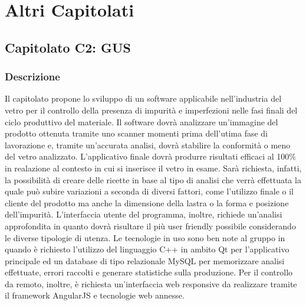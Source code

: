 %

\section{Altri Capitolati}


\subsection{Capitolato C2: GUS}

\subsubsection{Descrizione}
Il capitolato propone lo sviluppo di un software applicabile nell'industria del vetro per il controllo della presenza di impurità e imperfezioni nelle fasi finali del ciclo produttivo del materiale. Il software dovrà analizzare un'immagine del prodotto ottenuta tramite uno scanner momenti prima dell'utima fase di lavorazione e, tramite un'accurata analisi, dovrà stabilire la conformità o meno del vetro analizzato. L'applicativo finale dovrà produrre risultati efficaci al 100\% in realazione al contesto in cui si inserisce il vetro in esame. Sarà richiesta, infatti, la possibilità di creare delle ricette in base al tipo di analisi che verrà effettuata la quale può subire variazioni a seconda di diversi fattori, come l'utilizzo finale o il cliente del prodotto ma anche la dimensione della lastra o la forma e posizione dell'impurità.
L'interfaccia utente del programma, inoltre, richiede un'analisi approfondita in quanto dovrà risultare il più user friendly possibile considerando le diverse tipologie di utenza.
Le tecnologie in uso sono ben note al gruppo in quando è richiesto l'utilizzo del linguaggio C++ in ambito Qt per l'applicativo principale ed un database di tipo relazionale MySQL per memorizzare analisi effettuate, errori raccolti e generare statistiche sulla produzione. Per il controllo da remoto, inoltre, è richiesta un'interfaccia web responsive da realizzare tramite il framework AngularJS e tecnologie web annesse.

